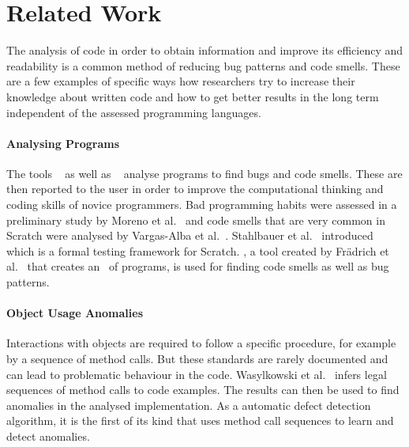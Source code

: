 \section{Related Work}\label{sec:related-work}
The analysis of code in order to obtain information and improve its efficiency and readability is a common method of reducing bug patterns and code smells. These are a few examples of specific ways how researchers try to increase their knowledge about written code and how to get better results in the long term independent of the assessed programming languages.

\paragraph{Analysing \scratch{} Programs}
The tools \drscratch{}~\cite{drscratch} as well as \hairball{}~\cite{hairball} analyse \scratch{} programs to find bugs and code smells. These are then reported to the user in order to improve the computational thinking and coding skills of novice programmers. Bad programming habits were assessed in a preliminary study by Moreno et al.~\cite{badhabits} and code smells that are very common in Scratch were analysed by Vargas-Alba et al.~\cite{badsmells}. Stahlbauer et al.~\cite{whisker} introduced \whisker{} which is a formal testing framework for Scratch. \litterbox, a tool created by Frädrich et al.~\cite{scratch_bugpatterns} that creates an \AST\ of \scratch{} programs, is used for finding code smells as well as bug patterns.

\paragraph{Object Usage Anomalies}
Interactions with objects are required to follow a specific procedure, for example by a sequence of method calls. But these standards are rarely documented and can lead to problematic behaviour in the code. Wasylkowski et al.~\cite{object_usage} infers legal sequences of method calls to code examples. The results can then be used to find anomalies in the analysed implementation. As a automatic defect detection algorithm, it is the first of its kind that uses method call sequences to learn and detect anomalies.

